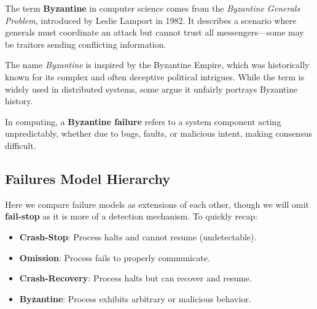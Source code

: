 \begin{Tip} The term \textbf{Byzantine} in computer science comes from the \textit{Byzantine Generals Problem}, introduced by Leslie Lamport in 1982. It describes a scenario where generals must coordinate an attack but cannot trust all messengers—some may be traitors sending conflicting information.

    The name \textit{Byzantine} is inspired by the Byzantine Empire, which was historically known for its complex and often deceptive political intrigues. While the term is widely used in distributed systems, some argue it unfairly portrays Byzantine history.

    In computing, a \textbf{Byzantine failure} refers to a system component acting unpredictably, whether due to bugs, faults, or malicious intent, making consensus difficult.

\end{Tip}

\newpage

\subsection{Failures Model Hierarchy}

Here we compare failure models as extensions of each other, though we will omit \textbf{fail-stop} as it is more of a detection mechanism.
To quickly recap:
\begin{itemize}
    \item \textbf{Crash-Stop}: Process halts and cannot resume (undetectable).
    \item \textbf{Omission}: Process fails to properly communicate.
    \item \textbf{Crash-Recovery}: Process halts but can recover and resume.
    \item \textbf{Byzantine}: Process exhibits arbitrary or malicious behavior.
\end{itemize}

